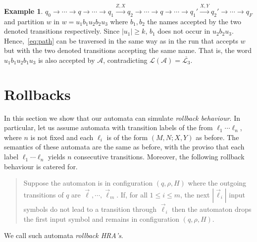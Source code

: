 \documentclass{article}
\theoremstyle{definition}
\newtheorem{example}[theorem]{Example}
\renewcommand\AA{\mathcal{A}}
\newcommand\LL{\mathcal{L}}
\newcommand\ta{,}
\begin{document}
\begin{example}
$
q_0\to\cdots\to q\to\cdots\to q_1\xrightarrow{Z\ta X}q_2\to\cdots\to q\to\cdots\to q_1'\xrightarrow{X\ta Y}q_2'\to\cdots\to q_F
$
and partition $w$ in $w=u_1b_1u_2b_2u_3$ where $b_1,b_2$ the names accepted by the two denoted transitions respectively. Since $|u_1|\geq k$, $b_1$ does not occur in $u_2b_2u_3$. Hence,~\eqref{eq:path} can be traversed in the same way as in the run that accepts $w$ but with the two denoted transitions accepting the same name. That is, the word $u_1b_1u_2b_1u_3$ is also accepted by $\AA$, contradicting $\LL(\AA)=\overline{\LL_3}$.

\end{example}

\section{Rollbacks}

In this section we show that our automata can simulate \emph{rollback behaviour}. In particular, let us assume automata with transition labels of the from $\ell_1\cdots\ell_n$, where $n$ is not fixed and each $\ell_i$ is of the form $(M\ta N;X\ta Y)$ as before. The semantics of these automata are the same as before, with the proviso that each label $\ell_1\cdots\ell_n$ yields $n$ consecutive transitions. Moreover, the following rollback behaviour is catered for.

\begin{quote}
Suppose the automaton is in configuration $(q,\rho,H)$ where the outgoing transitions of $q$ are $\vec{\ell},\cdots,\vec{\ell}_m$. If, for all $1\leq i\leq m$, the next $|\vec{\ell}_i|$ input symbols do not lead to a transition through $\vec{\ell}_i$ then the automaton drops the first input symbol and remains in configuration $(q,\rho,H)$.
\end{quote}
We call such automata \emph{rollback HRA's}.
\end{document}
